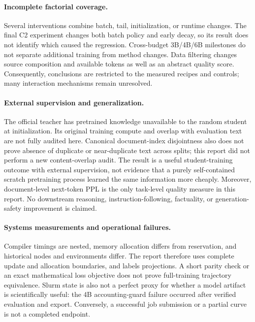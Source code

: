 \paragraph{Incomplete factorial coverage.}
Several interventions combine batch, tail, initialization, or runtime changes. The final C2 experiment changes both batch policy and early decay, so its result does not identify which caused the regression. Cross-budget 3B/4B/6B milestones do not separate additional training from method changes. Data filtering changes source composition and available tokens as well as an abstract quality score. Consequently, conclusions are restricted to the measured recipes and controls; many interaction mechanisms remain unresolved.

\paragraph{External supervision and generalization.}
The official teacher has pretrained knowledge unavailable to the random student at initialization. Its original training compute and overlap with evaluation text are not fully audited here. Canonical document-index disjointness also does not prove absence of duplicate or near-duplicate text across splits; this report did not perform a new content-overlap audit. The result is a useful student-training outcome with external supervision, not evidence that a purely self-contained scratch pretraining process learned the same information more cheaply. Moreover, document-level next-token PPL is the only task-level quality measure in this report. No downstream reasoning, instruction-following, factuality, or generation-safety improvement is claimed.

\paragraph{Systems measurements and operational failures.}
Compiler timings are nested, memory allocation differs from reservation, and historical nodes and environments differ. The report therefore uses complete update and allocation boundaries, and labels projections. A short parity check or an exact mathematical loss objective does not prove full-training trajectory equivalence. Slurm state is also not a perfect proxy for whether a model artifact is scientifically useful: the 4B accounting-guard failure occurred after verified evaluation and export. Conversely, a successful job submission or a partial curve is not a completed endpoint.

